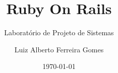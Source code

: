 \author{Luiz Alberto Ferreira Gomes}
\title{Ruby On Rails}
\subtitle{Laboratório de Projeto de Sistemas}
\date{\today}

